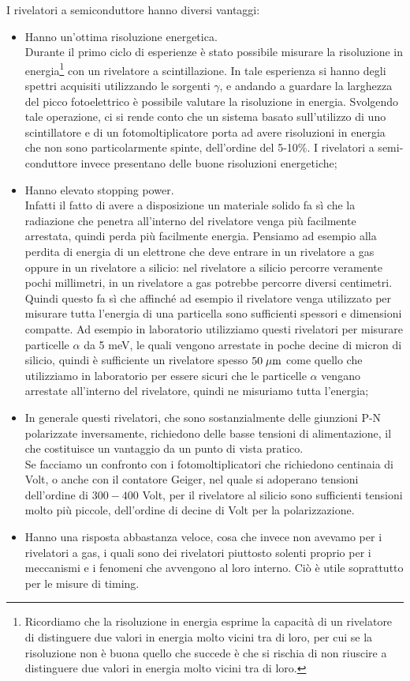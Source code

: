 I rivelatori a semiconduttore hanno diversi vantaggi:
\begin{itemize}[leftmargin=0.5cm]
   \item Hanno un'ottima risoluzione energetica.\\
   Durante il primo ciclo di esperienze è stato possibile misurare la risoluzione in energia\footnote{Ricordiamo che la risoluzione in energia esprime la capacità di un rivelatore di distinguere due valori in energia molto vicini tra di loro, per cui se la risoluzione non è buona quello che succede è che si rischia di non riuscire a distinguere due valori in energia molto vicini tra di loro.} con un rivelatore a scintillazione. In tale esperienza si hanno degli spettri acquisiti utilizzando le sorgenti $\gamma$, e andando a guardare la larghezza del picco fotoelettrico è possibile valutare la risoluzione in energia. Svolgendo tale operazione, ci si rende conto che un sistema basato sull'utilizzo di uno scintillatore e di un fotomoltiplicatore porta ad avere risoluzioni in energia che non sono particolarmente spinte, dell'ordine del 5-10\%. I rivelatori a semi-conduttore invece presentano delle buone risoluzioni energetiche;
   \item Hanno elevato stopping power.\\
   Infatti il fatto di avere a disposizione un materiale solido fa sì che la radiazione che penetra all'interno del rivelatore venga più facilmente arrestata, quindi perda più facilmente energia. Pensiamo ad esempio alla perdita di energia di un elettrone che deve entrare in un rivelatore a gas oppure in un rivelatore a silicio: nel rivelatore a silicio percorre veramente pochi millimetri, in un rivelatore a gas potrebbe percorre diversi centimetri. Quindi questo fa sì che affinché ad esempio il rivelatore venga utilizzato per misurare tutta l'energia di una particella sono sufficienti spessori e dimensioni compatte. Ad esempio in laboratorio utilizziamo questi rivelatori per misurare particelle $\alpha$ da 5 meV, le quali vengono arrestate in poche decine di micron di silicio, quindi è sufficiente un rivelatore spesso $50 \; \rm \mu m$ come quello che utilizziamo in laboratorio per essere sicuri che le particelle $\alpha$ vengano arrestate all'interno del rivelatore, quindi ne misuriamo tutta l'energia;
   \item In generale questi rivelatori, che sono sostanzialmente delle giunzioni P-N polarizzate inversamente, richiedono delle basse tensioni di alimentazione, il che costituisce un vantaggio da un punto di vista pratico.\\
   Se facciamo un confronto con i fotomoltiplicatori che richiedono centinaia di Volt, o anche con il contatore Geiger, nel quale si adoperano tensioni dell'ordine di $300-400$ Volt, per il rivelatore al silicio sono sufficienti tensioni molto più piccole, dell'ordine di decine di Volt per la polarizzazione.
   \item Hanno una risposta abbastanza veloce, cosa che invece non avevamo per i rivelatori a gas, i quali sono dei rivelatori piuttosto solenti proprio per i meccanismi e i fenomeni che avvengono al loro interno. Ciò è utile soprattutto per le misure di timing.
\end{itemize}

